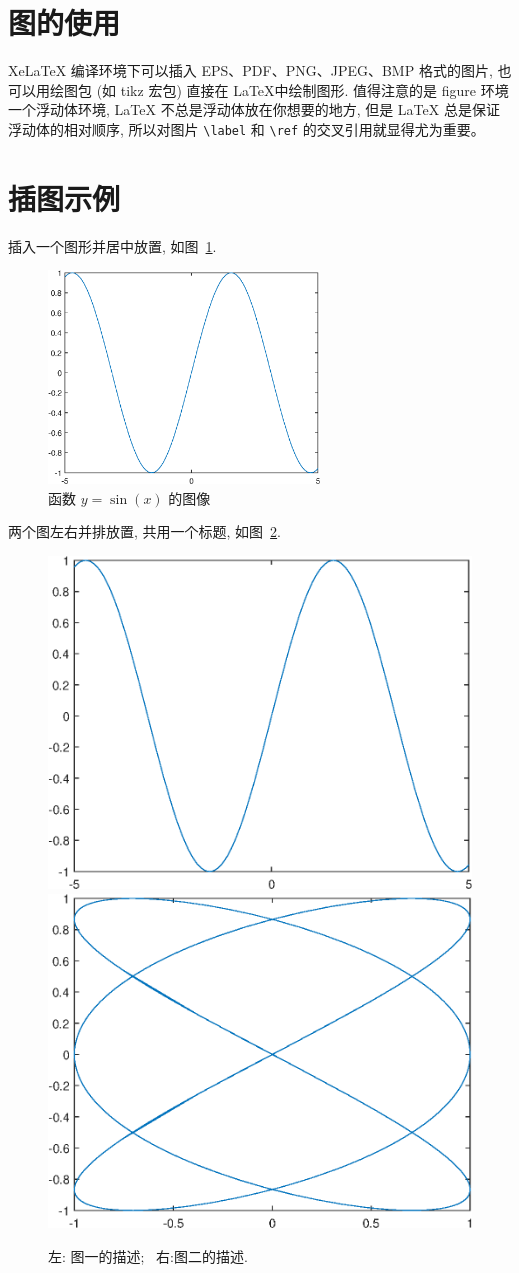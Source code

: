 \documentclass[UTF8,openany]{ctexbook}
\numberwithin{equation}{chapter}
\numberwithin{figure}{chapter}
\numberwithin{table}{chapter}
\theoremstyle{mystyle}
\begin{document}
\section{图的使用}

XeLaTeX 编译环境下可以插入 EPS、PDF、PNG、JPEG、BMP 格式的图片, 也可以用绘图包 (如 tikz 宏包) 直接在 \LaTeX 中绘制图形. 值得注意的是 figure 环境一个浮动体环境, LaTeX 不总是浮动体放在你想要的地方, 但是 LaTeX 总是保证浮动体的相对顺序, 所以对图片 \verb|\label| 和 \verb|\ref| 的交叉引用就显得尤为重要。

\section{插图示例}\label{sec:4-2}

插入一个图形并居中放置, 如图~\ref{fig:sinx}.
\begin{figure}[htp!]
  \centering
  \includegraphics[width=7.2cm]{image1}
  \caption{函数 $y=\sin(x)$ 的图像}\label{fig:sinx}
\end{figure}

\clearpage
两个图左右并排放置, 共用一个标题, 如图~\ref{fig:twofigs}.
\begin{figure}[htp!]
  \centering
  \includegraphics[width=0.45\linewidth]{image1}
  \hfill
  \includegraphics[width=0.45\linewidth]{image2}
  \caption{左: 图一的描述;~ 右:图二的描述.}
  \label{fig:twofigs}
\end{figure}
\end{document}
